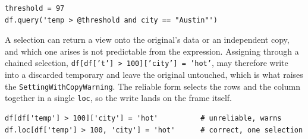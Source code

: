 \begin{lstlisting}[style=python, caption={query names columns bare and locals with @}]
threshold = 97
df.query('temp > @threshold and city == "Austin"')
\end{lstlisting}

\begin{keybox}
A selection can return a view onto the original's data or an independent copy, and which one arises is not predictable from the expression. Assigning through a chained selection, \texttt{df[df['t'] > 100]['city'] = 'hot'}, may therefore write into a discarded temporary and leave the original untouched, which is what raises the \texttt{SettingWithCopyWarning}. The reliable form selects the rows and the column together in a single \texttt{loc}, so the write lands on the frame itself.
\end{keybox}

\vspace{1ex}

\begin{lstlisting}[style=python, caption={The chained write warns and may no-op, the single loc is definite}]
df[df['temp'] > 100]['city'] = 'hot'          # unreliable, warns
df.loc[df['temp'] > 100, 'city'] = 'hot'      # correct, one selection
\end{lstlisting}

\vspace{-2ex}
